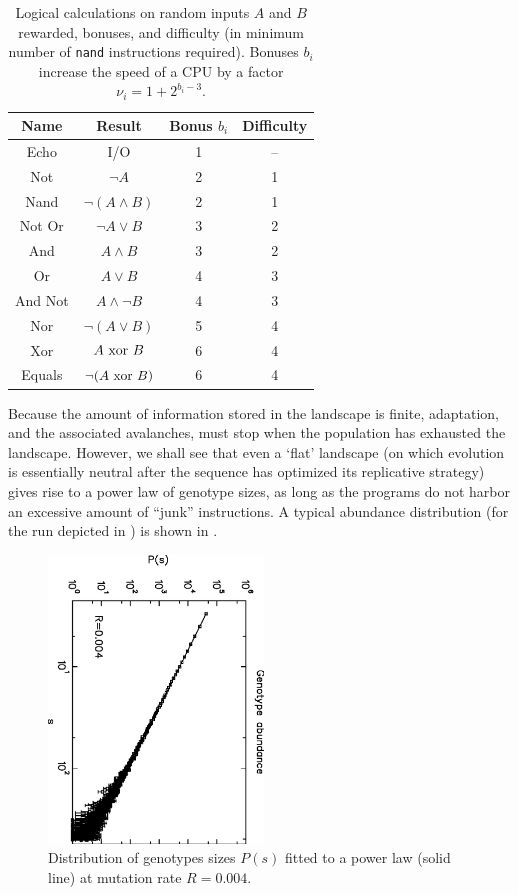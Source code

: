 \documentclass[letterpaper]{article}
\begin{document}
\begin{table}[ht]
    \centering
    \begin{tabular}{cccc}
        \toprule
        Name & Result & Bonus $b_i$ & Difficulty\\
        \midrule
        Echo & I/O   & 1 & --\\
        Not  & $\neg A$ & 2 & 1 \\
        Nand & $\neg(A\wedge B)$ & 2 & 1 \\
        Not Or & $\neg A \vee B$ & 3 & 2 \\
        And  &  $ A \wedge B $   & 3 & 2 \\
        Or   &  $ A \vee B $     & 4 & 3 \\
        And Not & $A\wedge\neg B$& 4 & 3 \\
        Nor  & $\neg(A\vee B)$   & 5 & 4 \\
        Xor  & $ A\ {\rm xor}\ B$ &   6 & 4 \\
        Equals &$\neg(A\ {\rm xor}\ B)$&6& 4 \\
        \bottomrule
    \end{tabular}
    \caption{
        Logical calculations on random inputs $A$ and $B$ rewarded,
        bonuses, and difficulty (in minimum number of {\tt nand} instructions
        required). Bonuses $b_i$ increase the speed of a CPU by a factor
        $\nu_i=1+2^{b_i-3}$.
    }
\end{table}

Because the amount of information stored in the landscape is finite,
adaptation, and the associated avalanches, must stop when the
population has exhausted the landscape.  However, we shall see that
even a `flat' landscape (on which evolution is essentially neutral
after the sequence has optimized its replicative strategy) gives rise
to a power law of genotype sizes, as long as the programs do not
harbor an excessive amount of ``junk'' instructions.  A typical
abundance distribution (for the run depicted in ) is
shown in .

\begin{figure}[ht]
    \centering
    \includegraphics[width=2.25in, angle=90]{fig3.eps}
    \caption{
        Distribution of genotypes sizes $P(s)$ fitted to a power law
        (solid line) at mutation rate $R=0.004$.
    }
    \label{fig3}
\end{figure}
\end{document}
